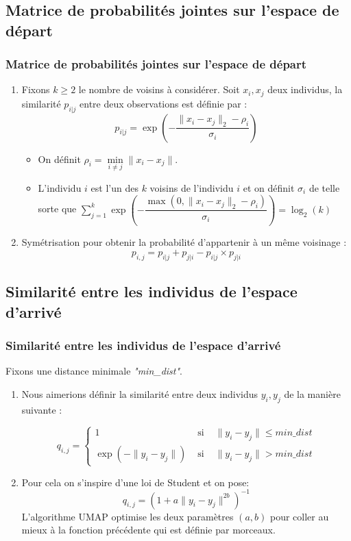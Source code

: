 \documentclass{beamer}
\theoremstyle{definition}
\begin{document}
\subsection{Matrice de probabilités jointes sur l'espace de départ}
\begin{frame}
\frametitle{Matrice de probabilités jointes sur l'espace de départ}
\begin{enumerate}
	\item Fixons $k\geq 2$ le nombre de voisins à considérer. Soit $x_i,x_j$ deux individus, la similarité $p_{i|j}$ entre deux observations est définie par :$$p_{i|j} = \exp\left(-\dfrac{\|x_i -x_j\|_2-\rho_i}{\sigma_i}\right)$$

	\begin{itemize}
		\item  On définit $\rho_i = \underset{i\neq j}{\min}\|x_i-x_j\|$.
		\item L'individu $i$ est l'un des $k$ voisins de l'individu $i$ et on définit $\sigma_i$ de telle sorte que $\displaystyle \sum_{j=1}^{k}\exp\left(-\dfrac{\max(0,\|x_i -x_j\|_2-\rho_i)}{\sigma_i}\right) = \log_2(k)$
	\end{itemize}
	\item Symétrisation pour obtenir la probabilité d'appartenir à un même voisinage : 
	$$p_{i,j} = p_{i|j} + p_{j|i} - p_{i|j} \times p_{j|i}$$ 
\end{enumerate}


	
\end{frame}

\subsection{Similarité entre les individus de l'espace d'arrivé}
\begin{frame}
	\frametitle{Similarité entre les individus de l'espace d'arrivé}
	Fixons une distance minimale \textit{"min\_dist"}.
	\begin{enumerate}
		\item Nous aimerions définir la similarité entre deux individus $y_i,y_j$ de la manière suivante : 
		
	 $$q_{i,j} = \left\{ \begin{array}{ccc}
			1 &\text{ si } & \|y_i-y_j\|\leq \textit{min\_dist}\\
			\exp(-\|y_i-y_j\|) &\text{ si } & \|y_i-y_j\|> \textit{min\_dist}
		\end{array}\right.$$
	
		\item Pour cela on s'inspire d'une loi de Student et on pose:
		$$q_{i,j} = \left(1+ a\|y_i-y_j\|^{2b}\right)^{-1}$$ 
		L'algorithme UMAP optimise les deux paramètres $(a,b)$ pour coller au mieux à la fonction précédente qui est définie par morceaux.  
	\end{enumerate}
	
	
\end{frame}
\end{document}
